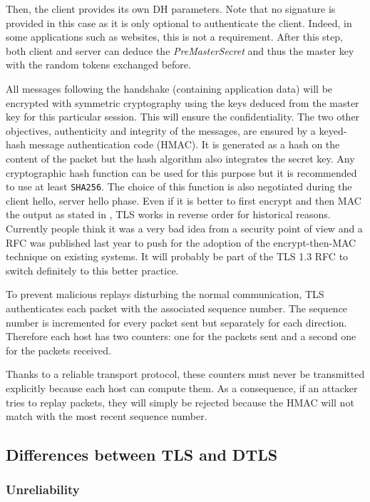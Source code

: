 Then, the client provides its own DH parameters. Note that no signature is provided in this case as it is only optional to authenticate the client. Indeed, in some applications such as websites, this is not a requirement. After this step, both client and server can deduce the \textit{PreMasterSecret} and thus the master key with the random tokens exchanged before.

All messages following the handshake (containing application data) will be encrypted with symmetric cryptography using the keys deduced from the master key for this particular session. This will ensure the confidentiality. The two other objectives, authenticity and integrity of the messages, are ensured by a keyed-hash message authentication code (HMAC). It is generated as a hash on the content of the packet but the hash algorithm also integrates the secret key. Any cryptographic hash function can be used for this purpose but it is recommended to use at least \texttt{SHA256}. The choice of this function is also negotiated during the client hello, server hello phase. Even if it is better to first encrypt and then MAC the output as stated in \cite{bellare2000authenticated}, TLS works in reverse order for historical reasons. Currently people think it was a very bad idea from a security point of view and a RFC \cite{rfc7366} was published last year to push for the adoption of the encrypt-then-MAC technique on existing systems. It will probably be part of the TLS 1.3 RFC \cite{draft-tls13} to switch definitely to this better practice.

To prevent malicious replays disturbing the normal communication, TLS authenticates each packet with the associated sequence number. The sequence number is incremented for every packet sent but separately for each direction. Therefore each host has two counters: one for the packets sent and a second one for the packets received.

Thanks to a reliable transport protocol, these counters must never be transmitted explicitly because each host can compute them. As a consequence, if an attacker tries to replay packets, they will simply be rejected because the HMAC will not match with the most recent sequence number.

\subsection{Differences between TLS and DTLS}

\subsubsection{Unreliability}

